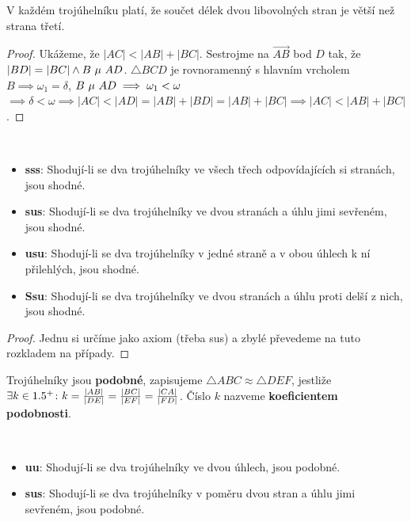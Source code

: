 \begin{veta}
  V každém trojúhelníku platí, že součet délek dvou libovolných stran je větší než strana třetí.
\end{veta}

\begin{proof}
  Ukážeme, že $|AC| < |AB| + |BC|$. Sestrojme na $\overrightarrow{AB}$ bod $D$ tak, že $|BD| = |BC| \land B\operatorname{\,\mu\,} AD$. $\triangle BCD$ je rovnoramenný s hlavním vrcholem $B \implies \omega_1 = \delta$, $B \operatorname{\,\mu\,} AD \implies \omega_1 < \omega$
  $\implies \delta < \omega \implies |AC| < |AD| = |AB| + |BD| = |AB| + |BC| \implies |AC| < |AB| + |BC|$.
\end{proof}

\begin{veta}
  \,

  \begin{itemize}
    \item \textbf{sss}: Shodují-li se dva trojúhelníky ve všech třech odpovídajících si stranách, jsou shodné.
    \item \textbf{sus}: Shodují-li se dva trojúhelníky ve dvou stranách a úhlu jimi sevřeném, jsou shodné.
    \item \textbf{usu}: Shodují-li se dva trojúhelníky v jedné straně a v obou úhlech k ní přilehlých, jsou shodné.
    \item \textbf{Ssu}: Shodují-li se dva trojúhelníky ve dvou stranách a úhlu proti delší z nich, jsou shodné.
  \end{itemize}
\end{veta}

\begin{proof}
  Jednu si určíme jako axiom (třeba sus) a zbylé převedeme na tuto rozkladem na případy.
\end{proof}

\begin{definition}
  Trojúhelníky jsou \textbf{podobné}, zapisujeme $\triangle ABC \approx \triangle DEF$, jestliže $\exists k \in 1.5^+\colon k = \frac{|AB|}{|DE|}=\frac{|BC|}{|EF|}=\frac{|CA|}{|FD|}$. Číslo $k$ nazveme \textbf{koeficientem podobnosti}.
\end{definition}

\begin{veta}
  \,
  \begin{itemize}
    \item \textbf{uu}: Shodují-li se dva trojúhelníky ve dvou úhlech, jsou podobné.
    \item \textbf{sus}: Shodují-li se dva trojúhelníky v poměru dvou stran a úhlu jimi sevřeném, jsou podobné.
  \end{itemize}
\end{veta}


